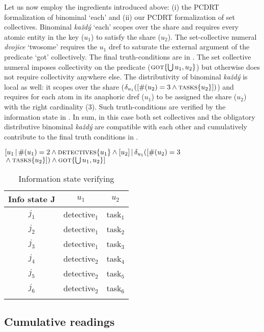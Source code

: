 \documentclass[output=paper,colorlinks,citecolor=brown,newtxmath]{langscibook}
\begin{document}
\noindent Let us now employ the ingredients introduced above: (i) the PCDRT formalization of binominal `each' and (ii) our PCDRT formalization of set collectives. Binominal \textit{každý} `each' scopes over the share and requires every atomic entity in the key ($u_1$) to satisfy the share ($u_2$). The set-collective numeral \textit{dvojice} `twosome' requires the $u_1$ dref to saturate the external argument of the predicate `got' collectively. The final truth-conditions are in . The set collective numeral imposes collectivity on the predicate ($\textsc{got}\{\bigcup u_1,u_2\}$) but otherwise does not require collectivity anywhere else. The distributivity of binominal \textit{každý} is local as well: it scopes over the share ($\delta_{u_1}([\#(u_2)=3 \wedge\textsc{tasks}\{u_2\}])$) and requires for each atom in its anaphoric dref ($u_1$) to be assigned the share ($u_2$) with the right cardinality (3). Such truth-conditions are verified by the information state in . In sum, in this case both set collectives and the obligatory distributive binominal \textit{každý} are compatible with each other and cumulatively contribute to the final truth conditions in .


\ea
\([u_1\,|\,\#(u_1)=2 \wedge \textsc{detectives}\{u_1\} \wedge [u_2]\,|\,\delta_{u_1}([\#(u_2)=3\)\\
\({}\wedge \textsc{tasks}\{u_2\}]) \wedge \textsc{got}\{\bigcup u_1,u_2\}]\)\label{sem:bin-each-set-coll}
\z


\begin{table}
\centering
\begin{tabularx}{0.45\textwidth}{ccc}
\lsptoprule
Info state J & \(u_1\) & \(u_2\)\tabularnewline
\midrule
\(j_1\) & detective\(_1\) & task\(_1\)\tabularnewline
\(j_2\) & detective\(_1\) & task\(_2\)\tabularnewline
\(j_3\) & detective\(_1\) & task\(_3\)\tabularnewline
\(j_4\) & detective\(_2\) & task\(_4\)\tabularnewline
\(j_5\) & detective\(_2\) & task\(_5\)\tabularnewline
\(j_6\) & detective\(_2\) & task\(_6\)\tabularnewline
\lspbottomrule
\end{tabularx}
\caption{Information state verifying }
\label{table5}
\end{table}

\subsection{Cumulative readings}

\end{document}
